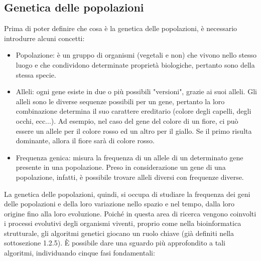 \subsection{Genetica delle popolazioni}
Prima di poter definire che cosa è la genetica delle popolazioni, è necessario introdurre alcuni concetti:
\begin{itemize}
	\item Popolazione: è un gruppo di organismi (vegetali e non) che vivono nello stesso luogo e che condividono determinate proprietà biologiche, pertanto sono della stessa specie.
	\item Alleli: ogni gene esiste in due o più possibili "versioni", grazie ai suoi alleli. Gli alleli sono le diverse sequenze possibili per un gene, pertanto la loro combinazione determina il suo carattere ereditario (colore degli capelli, degli occhi, ecc...). Ad esempio, nel caso del gene del colore di un fiore, ci può essere un allele per il colore rosso ed un altro per il giallo. Se il primo risulta dominante, allora il fiore sarà di colore rosso.
	\item Frequenza genica: misura la frequenza di un allele di un determinato gene presente in una popolazione.
	\newline
	Preso in considerazione un gene di una popolazione, infatti, è possibile trovare alleli diversi con frequenze diverse.
\end{itemize}
La genetica delle popolazioni, quindi, si occupa di studiare la frequenza dei geni delle popolazioni e della loro variazione nello spazio e nel tempo, dalla loro origine fino alla loro evoluzione.
\newline
Poiché in questa area di ricerca vengono coinvolti i processi evolutivi degli organismi viventi, proprio come nella bioinformatica strutturale, gli algoritmi genetici giocano un ruolo chiave (già definiti nella sottosezione 1.2.5). 
\newline
\`E possibile dare una sguardo più approfondito a tali algoritmi, individuando cinque fasi fondamentali:
